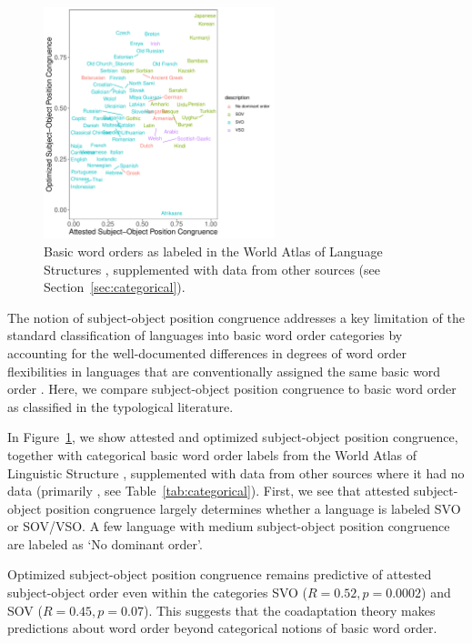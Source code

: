 \documentclass[11pt,a4paper]{article}
\begin{document}
\begin{figure}
    \centering
    \includegraphics[width=0.6\textwidth]{../analysis/categorical_order/figures/by_categorical_order.pdf}
	\caption{Basic word orders as labeled in the World Atlas of Language Structures \citep{wals-81}, supplemented with data from other sources (see Section~\ref{sec:categorical}).}
    \label{fig:categorical-basic-order}
\end{figure}



The notion of subject-object position congruence addresses a key limitation of the standard classification of languages into basic word order categories by accounting for the well-documented differences in degrees of word order flexibilities in languages that are conventionally assigned the same basic word order \citep{steele1978word}.
Here, we compare subject-object position congruence to basic word order as classified in the typological literature.


In Figure~\ref{fig:categorical-basic-order}, we show attested and optimized subject-object position congruence, together with categorical basic word order labels from the World Atlas of Linguistic Structure \citep{wals-81}, supplemented with data from other sources where it had no data (primarily \citep{gell-mann-origin-2011}, see Table~\ref{tab:categorical}).
First, we see that attested subject-object position congruence largely determines whether a language is labeled SVO or SOV/VSO.
A few language with medium subject-object position congruence are labeled as `No dominant order'.

Optimized subject-object position congruence remains predictive of attested subject-object order even within the categories SVO ($R = 0.52, p = 0.0002$) and SOV ($R=0.45, p = 0.07$).
This suggests that the coadaptation theory makes predictions about word order beyond categorical notions of basic word order.
\end{document}
